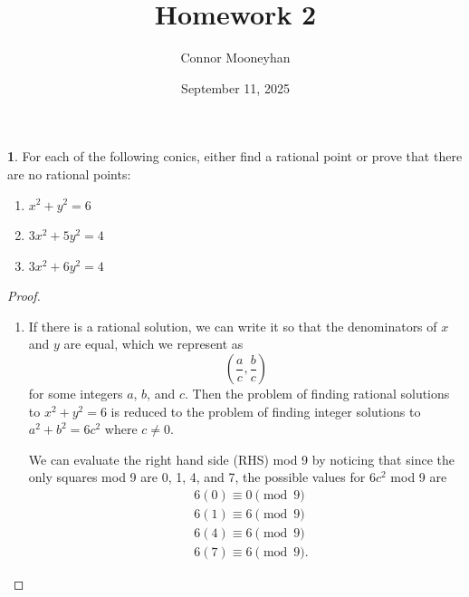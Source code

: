 \documentclass[12pt]{article}
\title{Homework 2}
\author{Connor Mooneyhan}
\date{September 11, 2025}
\theoremstyle{definition}
\newtheorem{ex}{}
\begin{document}
\maketitle

\begin{ex}
	For each of the following conics, either find a rational point or prove that there are no rational points:
	\begin{enumerate}[label=(\alph*)]
		\item $x^2+y^2=6$
		\item $3x^2 + 5y^2 = 4$
		\item $3x^2 + 6y^2 = 4$
	\end{enumerate}
\end{ex}
\begin{proof}
	\begin{enumerate}[label=(\alph*)]
		\item If there is a rational solution, we can write it so that the denominators of $x$ and $y$ are equal, which we represent as \begin{equation*}
			      \left(\frac{a}{c}, \frac{b}{c}\right)
		      \end{equation*} for some integers $a$, $b$, and $c$.
		      Then the problem of finding rational solutions to $x^2 + y^2 = 6$ is reduced to the problem of finding integer solutions to $a^2 + b^2 = 6c^2$ where $c \neq 0$.

		      We can evaluate the right hand side (RHS) mod 9 by noticing that since the only squares mod 9 are 0, 1, 4, and 7, the possible values for $6c^2$ mod 9 are \begin{align*}
			       & 6(0) \equiv 0 \pmod 9  \\
			       & 6(1) \equiv 6 \pmod 9  \\
			       & 6(4) \equiv 6 \pmod 9  \\
			       & 6(7) \equiv 6 \pmod 9.
		      \end{align*}


\end{enumerate}
\end{proof}
\end{document}
